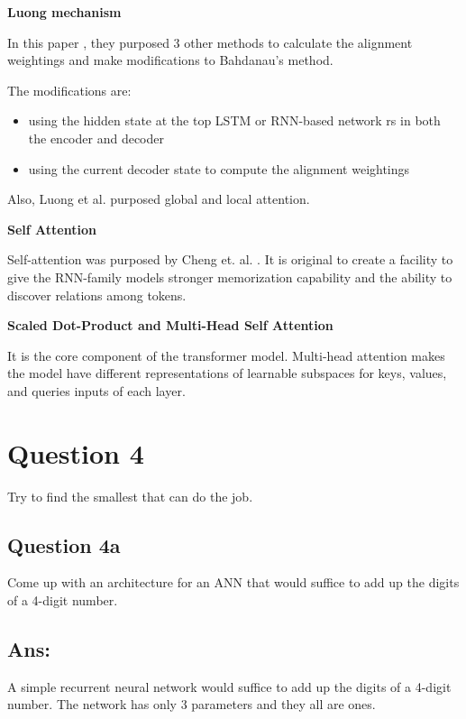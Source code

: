 \documentclass{kthreport}
\begin{document}
\textbf{Luong mechanism}

In this paper \cite{luong-etal-2015-effective},
they purposed 3 other methods to calculate the alignment weightings
and make modifications to Bahdanau's method.

The modifications are:
\begin{itemize}
    \item using the hidden state at the top LSTM or RNN-based network rs in both the encoder and decoder
    \item using the current decoder state to compute the alignment weightings
\end{itemize}

Also, Luong et al. \cite{luong-etal-2015-effective} purposed global and local attention.

\textbf{Self Attention}

Self-attention was purposed by Cheng et. al. \cite{cheng-etal-2016-long}. It is
original to create a facility to give the RNN-family models stronger memorization
capability and the ability to discover relations among tokens.

\textbf{Scaled Dot-Product and Multi-Head Self Attention}

It is the core component of the transformer model. \cite{vaswani2017attention}
Multi-head attention makes the model have different representations of
learnable subspaces for keys, values, and queries inputs of each layer.




\section{Question 4}
Try to find the smallest that can do the job.

\subsection{Question 4a}
Come up with an architecture for an ANN that would suffice to add up the digits of a 4-digit number.

\subsection*{Ans:}
A simple recurrent neural network would suffice to add up the digits of a 4-digit number.
The network has only 3 parameters and they all are ones.
\end{document}
